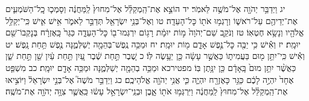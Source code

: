 \documentclass[twoside, openany, parskip=half, 11pt]{book}
\begin{document}
יג וַיְדַבֵּ֥ר יְהֹוָ֖ה אֶל־מֹשֶׁ֥ה לֵּאמֹֽר׃ יד הוֹצֵ֣א אֶת־הַֽמְקַלֵּ֗ל אֶל־מִחוּץ֙ לַֽמַּחֲנֶ֔ה וְסָמְכ֧וּ כׇֽל־הַשֹּׁמְעִ֛ים אֶת־יְדֵיהֶ֖ם עַל־רֹאשׁ֑וֹ וְרָגְמ֥וּ אֹת֖וֹ כׇּל־הָעֵדָֽה׃ טו וְאֶל־בְּנֵ֥י יִשְׂרָאֵ֖ל תְּדַבֵּ֣ר לֵאמֹ֑ר אִ֥ישׁ אִ֛ישׁ כִּֽי־יְקַלֵּ֥ל אֱלֹהָ֖יו וְנָשָׂ֥א חֶטְאֽוֹ׃ טז וְנֹקֵ֤ב שֵׁם־יְהֹוָה֙ מ֣וֹת יוּמָ֔ת רָג֥וֹם יִרְגְּמוּ־ב֖וֹ כׇּל־הָעֵדָ֑ה כַּגֵּר֙ כָּֽאֶזְרָ֔ח בְּנׇקְבוֹ־שֵׁ֖ם יוּמָֽת׃ יז וְאִ֕ישׁ כִּ֥י יַכֶּ֖ה כׇּל־נֶ֣פֶשׁ אָדָ֑ם מ֖וֹת יוּמָֽת׃ יח וּמַכֵּ֥ה נֶֽפֶשׁ־בְּהֵמָ֖ה יְשַׁלְּמֶ֑נָּה נֶ֖פֶשׁ תַּ֥חַת נָֽפֶשׁ׃ יט וְאִ֕ישׁ כִּֽי־יִתֵּ֥ן מ֖וּם בַּעֲמִית֑וֹ כַּאֲשֶׁ֣ר עָשָׂ֔ה כֵּ֖ן יֵעָ֥שֶׂה לּֽוֹ׃ כ שֶׁ֚בֶר תַּ֣חַת שֶׁ֔בֶר עַ֚יִן תַּ֣חַת עַ֔יִן שֵׁ֖ן תַּ֣חַת שֵׁ֑ן כַּאֲשֶׁ֨ר יִתֵּ֥ן מוּם֙ בָּֽאָדָ֔ם כֵּ֖ן יִנָּ֥תֶן בּֽוֹ׃ מפטירכא וּמַכֵּ֥ה בְהֵמָ֖ה יְשַׁלְּמֶ֑נָּה וּמַכֵּ֥ה אָדָ֖ם יוּמָֽת׃ כב מִשְׁפַּ֤ט אֶחָד֙ יִהְיֶ֣ה לָכֶ֔ם כַּגֵּ֥ר כָּאֶזְרָ֖ח יִהְיֶ֑ה כִּ֛י אֲנִ֥י יְהֹוָ֖ה אֱלֹהֵיכֶֽם׃ כג וַיְדַבֵּ֣ר מֹשֶׁה֮ אֶל־בְּנֵ֣י יִשְׂרָאֵל֒ וַיּוֹצִ֣יאוּ אֶת־הַֽמְקַלֵּ֗ל אֶל־מִחוּץ֙ לַֽמַּחֲנֶ֔ה וַיִּרְגְּמ֥וּ אֹת֖וֹ אָ֑בֶן וּבְנֵֽי־יִשְׂרָאֵ֣ל עָשׂ֔וּ כַּֽאֲשֶׁ֛ר צִוָּ֥ה יְהֹוָ֖ה אֶת־מֹשֶֽׁה׃
\end{document}
